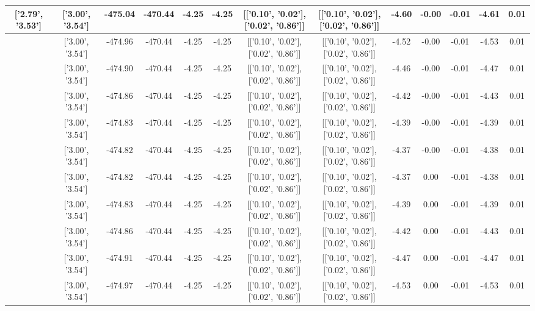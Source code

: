 \begin{table}[htbp]
\begin{adjustbox}{angle=90}
\begin{tabular}{|c|c|c|c|c|c|c|c|c|c|c|c|c|}
 ['2.79', '3.53'] & ['3.00', '3.54'] & -475.04 & -470.44 & -4.25 & -4.25 & [['0.10', '0.02'], ['0.02', '0.86']] & [['0.10', '0.02'], ['0.02', '0.86']] & -4.60 & -0.00 & -0.01 & -4.61 & 0.01\\ \hline
 ['2.83', '3.53'] & ['3.00', '3.54'] & -474.96 & -470.44 & -4.25 & -4.25 & [['0.10', '0.02'], ['0.02', '0.86']] & [['0.10', '0.02'], ['0.02', '0.86']] & -4.52 & -0.00 & -0.01 & -4.53 & 0.01\\ \hline
 ['2.86', '3.53'] & ['3.00', '3.54'] & -474.90 & -470.44 & -4.25 & -4.25 & [['0.10', '0.02'], ['0.02', '0.86']] & [['0.10', '0.02'], ['0.02', '0.86']] & -4.46 & -0.00 & -0.01 & -4.47 & 0.01\\ \hline
 ['2.90', '3.53'] & ['3.00', '3.54'] & -474.86 & -470.44 & -4.25 & -4.25 & [['0.10', '0.02'], ['0.02', '0.86']] & [['0.10', '0.02'], ['0.02', '0.86']] & -4.42 & -0.00 & -0.01 & -4.43 & 0.01\\ \hline
 ['2.94', '3.54'] & ['3.00', '3.54'] & -474.83 & -470.44 & -4.25 & -4.25 & [['0.10', '0.02'], ['0.02', '0.86']] & [['0.10', '0.02'], ['0.02', '0.86']] & -4.39 & -0.00 & -0.01 & -4.39 & 0.01\\ \hline
 ['2.98', '3.54'] & ['3.00', '3.54'] & -474.82 & -470.44 & -4.25 & -4.25 & [['0.10', '0.02'], ['0.02', '0.86']] & [['0.10', '0.02'], ['0.02', '0.86']] & -4.37 & -0.00 & -0.01 & -4.38 & 0.01\\ \hline
 ['3.02', '3.54'] & ['3.00', '3.54'] & -474.82 & -470.44 & -4.25 & -4.25 & [['0.10', '0.02'], ['0.02', '0.86']] & [['0.10', '0.02'], ['0.02', '0.86']] & -4.37 & 0.00 & -0.01 & -4.38 & 0.01\\ \hline
 ['3.05', '3.54'] & ['3.00', '3.54'] & -474.83 & -470.44 & -4.25 & -4.25 & [['0.10', '0.02'], ['0.02', '0.86']] & [['0.10', '0.02'], ['0.02', '0.86']] & -4.39 & 0.00 & -0.01 & -4.39 & 0.01\\ \hline
 ['3.09', '3.55'] & ['3.00', '3.54'] & -474.86 & -470.44 & -4.25 & -4.25 & [['0.10', '0.02'], ['0.02', '0.86']] & [['0.10', '0.02'], ['0.02', '0.86']] & -4.42 & 0.00 & -0.01 & -4.43 & 0.01\\ \hline
 ['3.13', '3.55'] & ['3.00', '3.54'] & -474.91 & -470.44 & -4.25 & -4.25 & [['0.10', '0.02'], ['0.02', '0.86']] & [['0.10', '0.02'], ['0.02', '0.86']] & -4.47 & 0.00 & -0.01 & -4.47 & 0.01\\ \hline
 ['3.17', '3.55'] & ['3.00', '3.54'] & -474.97 & -470.44 & -4.25 & -4.25 & [['0.10', '0.02'], ['0.02', '0.86']] & [['0.10', '0.02'], ['0.02', '0.86']] & -4.53 & 0.00 & -0.01 & -4.53 & 0.01\\ \hline

\end{tabular}
\end{adjustbox}
\end{table}
